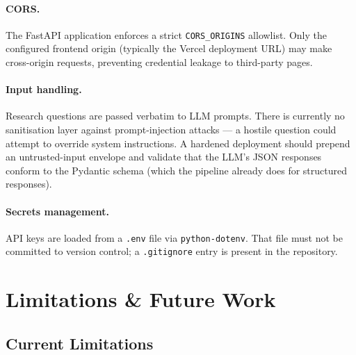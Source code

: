 \documentclass[10pt, twocolumn]{article}
\begin{document}
\paragraph{CORS.}
The FastAPI application enforces a strict \texttt{CORS\_ORIGINS} allowlist.
Only the configured frontend origin (typically the Vercel deployment URL) may
make cross-origin requests, preventing credential leakage to third-party pages.

\paragraph{Input handling.}
Research questions are passed verbatim to LLM prompts. There is currently no
sanitisation layer against prompt-injection attacks — a hostile question could
attempt to override system instructions. A hardened deployment should prepend
an untrusted-input envelope and validate that the LLM's JSON responses conform
to the Pydantic schema (which the pipeline already does for structured
responses).

\paragraph{Secrets management.}
API keys are loaded from a \texttt{.env} file via \texttt{python-dotenv}.
That file must not be committed to version control; a \texttt{.gitignore}
entry is present in the repository.

\section{Limitations \& Future Work}

\subsection{Current Limitations}
\end{document}
